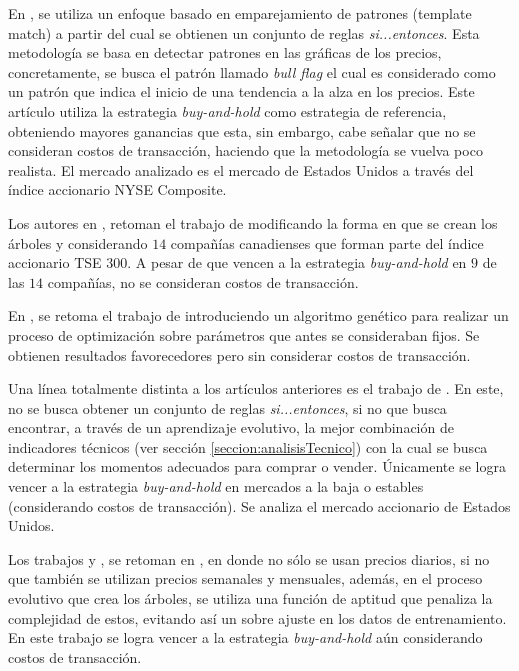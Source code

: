 \documentclass[12pt]{scrbook}
\theoremstyle{break}
\theoremstyle{break}
\newcommand{\buyhold}{\textit{buy-and-hold} }
\begin{document}
En \cite{Leigh2002}, se utiliza un enfoque basado en emparejamiento de patrones (template match) a partir del cual se obtienen un conjunto de reglas \textit{si...entonces}. Esta metodología se basa en detectar patrones en las gráficas de los precios, concretamente, se busca el patrón llamado \textit{bull flag} el cual es considerado como un patrón que indica el inicio de una tendencia a la alza en los precios. Este artículo utiliza la estrategia \buyhold como estrategia de referencia, obteniendo mayores ganancias que esta, sin embargo, cabe señalar que no se consideran costos de transacción, haciendo que la metodología se vuelva poco realista. El mercado analizado es el mercado de Estados Unidos a través del índice accionario NYSE Composite.

Los autores en \cite{Potvin2004}, retoman el trabajo de \cite{Allen1999} modificando la forma en que se crean los árboles y considerando $14$ compañías canadienses que forman parte del índice accionario TSE $300$. A pesar de que vencen a la estrategia \buyhold en $9$ de las $14$ compañías, no se consideran costos de transacción.

En \cite{Parracho2010}, se retoma el trabajo de \cite{Leigh2002} introduciendo un algoritmo genético para realizar un proceso de optimización sobre parámetros que antes se consideraban fijos. Se obtienen resultados favorecedores pero sin considerar costos de transacción.

Una línea totalmente distinta a los artículos anteriores es el trabajo de \cite{Kaucic2010}. En este, no se busca obtener un conjunto de reglas \textit{si...entonces}, si no que busca encontrar, a través de un aprendizaje evolutivo, la mejor combinación de indicadores técnicos (ver sección \ref{seccion:analisisTecnico}) con la cual se busca determinar los momentos adecuados para comprar o vender. Únicamente se logra vencer a la estrategia \buyhold en mercados a la baja o estables (considerando costos de transacción). Se analiza el mercado accionario de Estados Unidos.

Los trabajos \cite{Allen1999} y \cite{Potvin2004}, se retoman en \cite{Lohpetch2010}, en donde no sólo se usan precios diarios, si no que también se utilizan precios semanales y mensuales, además, en el proceso evolutivo que crea los árboles, se utiliza una función de aptitud que penaliza la complejidad de estos, evitando así un sobre ajuste en los datos de entrenamiento. En este trabajo se logra vencer a la estrategia \buyhold aún considerando costos de transacción.
\end{document}
